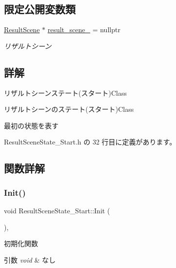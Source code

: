 \subsection*{限定公開変数類}
\begin{DoxyCompactItemize}
\item 
\mbox{\hyperlink{class_result_scene}{Result\+Scene}} $\ast$ \mbox{\hyperlink{class_result_scene_state___start_a223a52e93231e460dad3401a1a49931d}{result\+\_\+scene\+\_\+}} = nullptr
\begin{DoxyCompactList}\small\item\em リザルトシーン \end{DoxyCompactList}\end{DoxyCompactItemize}


\subsection{詳解}
リザルトシーンステート(スタート)Class 

リザルトシーンのステート(スタート)Class

最初の状態を表す 

 Result\+Scene\+State\+\_\+\+Start.\+h の 32 行目に定義があります。



\subsection{関数詳解}
\mbox{\label{class_result_scene_state___start_a615c7e05efd2320b8956c5fd94398f55}} 
\subsubsection{\texorpdfstring{Init()}{Init()}}
{\footnotesize\ttfamily void Result\+Scene\+State\+\_\+\+Start\+::\+Init (\begin{DoxyParamCaption}{ }\end{DoxyParamCaption})\hspace{0.3cm}{\ttfamily [override]}, {\ttfamily [virtual]}}



初期化関数 


\begin{DoxyParams}{引数}
{\em void} & なし \\
\hline
\end{DoxyParams}

